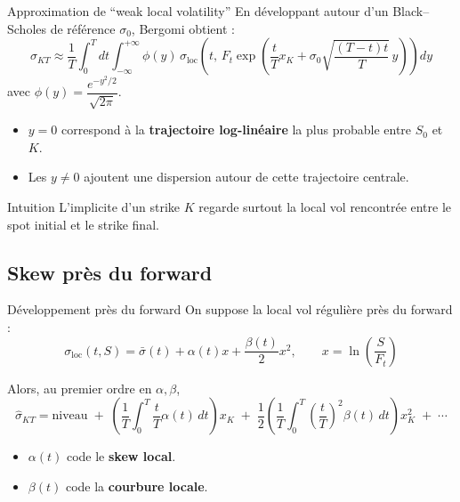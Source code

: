 \begin{frame}{Approximation de ``weak local volatility''}
\small
En développant autour d'un Black--Scholes de référence \(\sigma_0\), Bergomi obtient :
\[
\hat{\sigma}_{KT}
\approx
\frac{1}{T}\int_0^T\!\!dt
\int_{-\infty}^{+\infty}\phi(y)\,
\sigma_{\mathrm{loc}}\!\left(
t,\,
F_t\exp\!\left(
\frac{t}{T}x_K+\sigma_0\sqrt{\frac{(T-t)t}{T}}\,y
\right)\right)dy
\]
avec \(\phi(y)=\dfrac{e^{-y^2/2}}{\sqrt{2\pi}}\).

\begin{itemize}
    \item \(y=0\) correspond à la \textbf{trajectoire log-linéaire} la plus probable entre \(S_0\) et \(K\).
    \item Les \(y\neq 0\) ajoutent une dispersion autour de cette trajectoire centrale.
\end{itemize}

\begin{block}{Intuition}
L'implicite d'un strike \(K\) regarde surtout la local vol rencontrée entre le spot initial et le strike final.
\end{block}
\end{frame}

\subsection{Skew près du forward}

\begin{frame}{Développement près du forward}
\small
On suppose la local vol régulière près du forward :
\[
\sigma_{\mathrm{loc}}(t,S)
=
\bar{\sigma}(t)+\alpha(t)x+\frac{\beta(t)}{2}x^2,
\qquad
x=\ln\!\left(\frac{S}{F_t}\right)
\]

Alors, au premier ordre en \(\alpha,\beta\),
\[
\hat{\sigma}_{KT}
=
\text{niveau}
\;+\;
\left(\frac{1}{T}\int_0^T\frac{t}{T}\alpha(t)\,dt\right)x_K
\;+\;
\frac12
\left(\frac{1}{T}\int_0^T\left(\frac{t}{T}\right)^2\beta(t)\,dt\right)x_K^2
\;+\;\cdots
\]

\begin{itemize}
    \item \(\alpha(t)\) code le \textbf{skew local}.
    \item \(\beta(t)\) code la \textbf{courbure locale}.
\end{itemize}
\end{frame}

